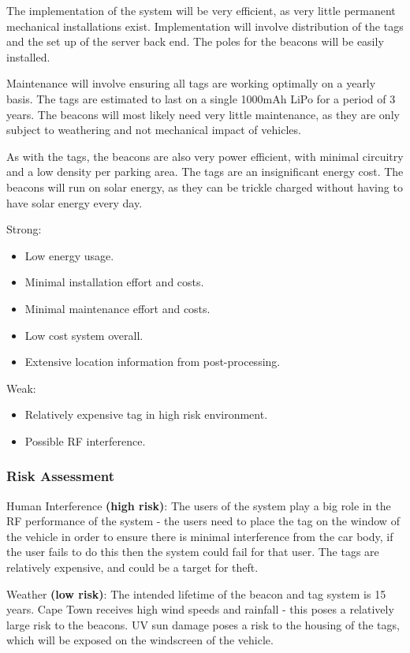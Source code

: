 The implementation of the system will be very efficient, as very little permanent mechanical installations exist. Implementation will involve distribution of the tags and the set up of the server back end. The poles for the beacons will be easily installed. 

\newpage
{}
Maintenance will involve ensuring all tags are working optimally on a yearly basis. The tags are estimated to last on a single 1000mAh LiPo for a period of 3 years. The beacons will most likely need very little maintenance, as they are only subject to weathering and not mechanical impact of vehicles. 

As with the tags, the beacons are also very power efficient, with minimal circuitry and a low density per parking area. The tags are an insignificant energy cost. The beacons will run on solar energy, as they can be trickle charged without having to have solar energy every day.

Strong:
\begin{itemize}
\item Low energy usage.
\item Minimal installation effort and costs.
\item Minimal maintenance effort and costs.
\item Low cost system overall.
\item Extensive location information from post-processing.
\end{itemize}

Weak:
\begin{itemize}
\item Relatively expensive tag in high risk environment.
\item Possible RF interference.
\end{itemize}


\subsubsection{Risk Assessment}
Human Interference \textbf{(high risk)}: The users of the system play a big role in the RF performance of the system - the users need to place the tag on the window of the vehicle in order to ensure there is minimal interference from the car body, if the user fails to do this then the system could fail for that user. The tags are relatively expensive, and could be a target for theft.

Weather \textbf{(low risk)}: The intended lifetime of the beacon and tag system is 15 years. Cape Town receives high wind speeds and rainfall - this poses a relatively large risk to the beacons. UV sun damage poses a risk to the housing of the tags, which will be exposed on the windscreen of the vehicle. 

